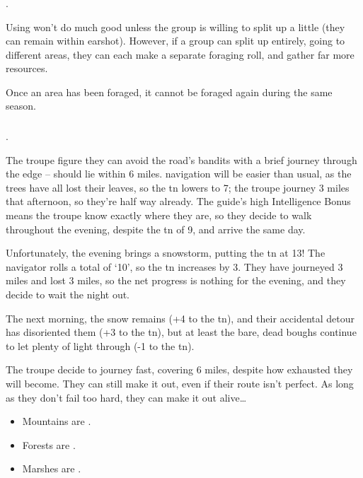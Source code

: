 \begin{multicols}{2}
\subsubsection{}
%
.

Using  won't do much good unless the group is willing to split up a little (they can remain within earshot).
However, if a group can split up entirely, going to different areas, they can each make a separate foraging roll, and gather far more resources.

Once an area has been foraged, it cannot be foraged again during the same season.

\subsubsection{}
\label{navigate_land}
.

\begin{exampletext}
  The troupe figure they can avoid the road's bandits with a brief journey through the \gls{edge} --  should lie within 6 miles.
  \Gls{navigation} will be easier than usual, as the trees have all lost their leaves, so the \gls{tn} lowers to 7; the troupe journey 3 miles that afternoon, so they're half way already.
  The guide's high Intelligence Bonus means the troupe know exactly where they are, so they decide to walk throughout the evening, despite the \gls{tn} of 9, and arrive the same day.

  Unfortunately, the evening brings a snowstorm, putting the \gls{tn} at 13!
  The navigator rolls a total of `10', so the \gls{tn} increases by 3.
  They have journeyed 3 miles and lost 3 miles, so the net progress is nothing for the evening, and they decide to wait the night out.

  The next morning, the snow remains (+4 to the \gls{tn}), and their accidental detour has disoriented them (+3 to the \gls{tn}), but at least the bare, dead boughs continue to let plenty of light through (-1 to the \gls{tn}).

  The troupe decide to journey fast, covering 6 miles, despite how exhausted they will become.
  They can still make it out, even if their route isn't perfect.
  As long as they don't fail too hard, they can make it out alive\ldots
\end{exampletext}

\begin{multicols}{2}
\begin{itemize}
  \item
    Mountains are \tn[8].
  \item
    Forests are \tn[11].
  \item
    Marshes are \tn[12].
\end{itemize}


\end{multicols}
\end{multicols}
